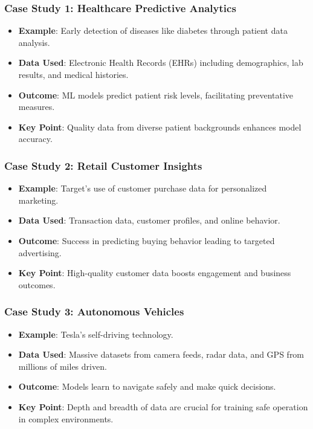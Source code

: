 \documentclass[aspectratio=169]{beamer}
\begin{document}
\begin{frame}[fragile]
    \frametitle{Case Study 1: Healthcare Predictive Analytics}
    \begin{itemize}
        \item \textbf{Example}: Early detection of diseases like diabetes through patient data analysis.
        \item \textbf{Data Used}: Electronic Health Records (EHRs) including demographics, lab results, and medical histories.
        \item \textbf{Outcome}: ML models predict patient risk levels, facilitating preventative measures.
        \item \textbf{Key Point}: Quality data from diverse patient backgrounds enhances model accuracy.
    \end{itemize}
\end{frame}

\begin{frame}[fragile]
    \frametitle{Case Study 2: Retail Customer Insights}
    \begin{itemize}
        \item \textbf{Example}: Target's use of customer purchase data for personalized marketing.
        \item \textbf{Data Used}: Transaction data, customer profiles, and online behavior.
        \item \textbf{Outcome}: Success in predicting buying behavior leading to targeted advertising.
        \item \textbf{Key Point}: High-quality customer data boosts engagement and business outcomes.
    \end{itemize}
\end{frame}

\begin{frame}[fragile]
    \frametitle{Case Study 3: Autonomous Vehicles}
    \begin{itemize}
        \item \textbf{Example}: Tesla’s self-driving technology.
        \item \textbf{Data Used}: Massive datasets from camera feeds, radar data, and GPS from millions of miles driven.
        \item \textbf{Outcome}: Models learn to navigate safely and make quick decisions.
        \item \textbf{Key Point}: Depth and breadth of data are crucial for training safe operation in complex environments.
    \end{itemize}
\end{frame}
\end{document}

